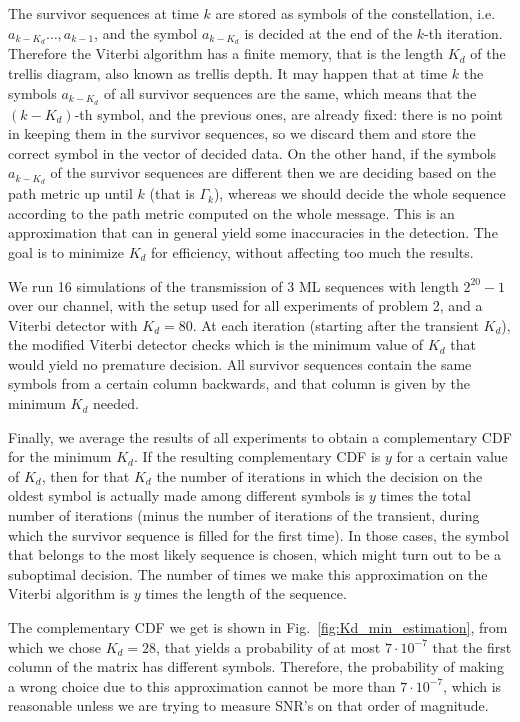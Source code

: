 \documentclass[10pt]{article}
\begin{document}
The survivor sequences at time $k$ are stored as symbols of the constellation, i.e. $a_{k-K_d} \ldots,a_{k-1}$, and the symbol $a_{k-K_d}$ is decided at the end of the $k$-th iteration. Therefore the Viterbi algorithm has a finite memory, that is the length $K_d$ of the trellis diagram, also known as trellis depth. It may happen that at time $k$ the symbols $a_{k-K_d}$ of all survivor sequences are the same, which means that the $(k-K_d)$-th symbol, and the previous ones, are already fixed: there is no point in keeping them in the survivor sequences, so we discard them and store the correct symbol in the vector of decided data. On the other hand, if the symbols $a_{k-K_d}$ of the survivor sequences are different then we are deciding based on the path metric up until $k$ (that is $\Gamma_k$), whereas we should decide the whole sequence according to the path metric computed on the whole message. This is an approximation that can in general yield some inaccuracies in the detection. The goal is to minimize $K_d$ for efficiency, without affecting too much the results.

We run 16 simulations of the transmission of 3 ML sequences with length $2^{20} - 1$ over our channel, with the setup used for all experiments of problem 2, and a Viterbi detector with $K_d = 80$. At each iteration (starting after the transient $K_d$), the modified Viterbi detector checks which is the minimum value of $K_d$ that would yield no premature decision. All survivor sequences contain the same symbols from a certain column backwards, and that column is given by the minimum $K_d$ needed.

Finally, we average the results of all experiments to obtain a complementary CDF for the minimum $K_d$. If the resulting complementary CDF is $y$ for a certain value of $K_d$, then for that $K_d$ the number of iterations in which the decision on the oldest symbol is actually made among different symbols is $y$ times the total number of iterations (minus the number of iterations of the transient, during which the survivor sequence is filled for the first time). In those cases, the symbol that belongs to the most likely sequence is chosen, which might turn out to be a suboptimal decision. The number of times we make this approximation on the Viterbi algorithm is $y$ times the length of the sequence.

The complementary CDF we get is shown in Fig.~\ref{fig:Kd_min_estimation}, from which we chose $K_d = 28$, that yields a probability of at most $7\cdot 10^{-7}$ that the first column of the matrix has different symbols. Therefore, the probability of making a wrong choice due to this approximation cannot be more than $7\cdot 10^{-7}$, which is reasonable unless we are trying to measure SNR's on that order of magnitude.
\end{document}
